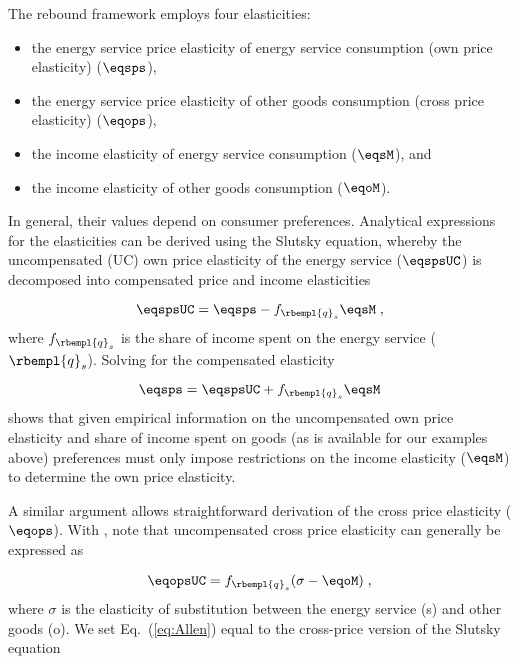 

The rebound framework employs four elasticities:
%
\begin{itemize}

  \item the energy service price elasticity of energy service consumption (own price elasticity) ($\eqsps$),

  \item the energy service price elasticity of other goods consumption (cross price elasticity) ($\eqops$), 
  
  \item the income elasticity of energy service consumption ($\eqsM$), and 
  
  \item the income elasticity of other goods consumption ($\eqoM$).

\end{itemize}
%
In general, their values depend on consumer preferences.
Analytical expressions for the elasticities can be derived using the Slutsky equation, 
whereby the uncompensated (UC) own price elasticity 
of the energy service ($\eqspsUC$) 
is decomposed into compensated price and income elasticities

\begin{equation}
  \eqspsUC = \eqsps - f_{\rbempl{q}_s} \eqsM \; ,
\end{equation}
%
where $f_{\rbempl{q}_s}$ is the share of income spent 
on the energy service ($\rbempl{q}_s$). 
Solving for the compensated elasticity 

\begin{equation} \label{eq:eqsps}
  \eqsps = \eqspsUC + f_{\rbempl{q}_s} \eqsM
\end{equation}
 shows that given empirical information on the uncompensated own price elasticity and share of income spent on goods (as is available for our examples above) preferences must only impose restrictions on the income elasticity ($\eqsM$) to determine the own price elasticity.
 
A similar argument allows straightforward derivation 
of the cross price elasticity ($\eqops$).
With \citet{Hicks1934}, 
note that uncompensated cross price elasticity can generally be expressed as

\begin{equation} \label{eq:Allen}
  \eqopsUC = f_{\rbempl{q}_s} (\sigma - \eqoM) \; ,
\end{equation}
%
where $\sigma$ is the elasticity of substitution between the energy service (s) and other goods (o). 
We set Eq.~(\ref{eq:Allen}) equal to 
the cross-price version of the Slutsky equation

